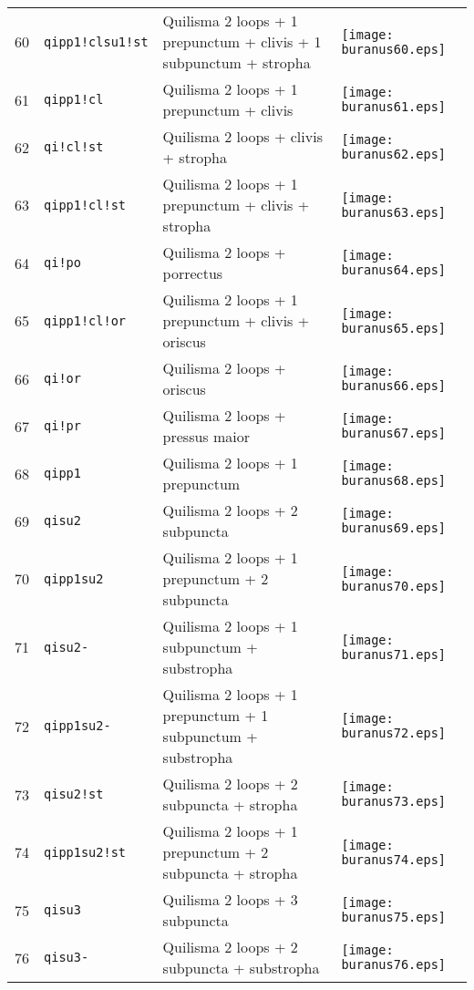 \documentclass{scrarticle}
\begin{document}
\begin{longtable}{l|l|l|l}
60 & \texttt{qipp1!clsu1!st} & Quilisma 2 loops + 1 prepunctum + clivis + 1 subpunctum + stropha & \texttt{[image: buranus60.eps]} \\
61 & \texttt{qipp1!cl} & Quilisma 2 loops + 1 prepunctum + clivis & \texttt{[image: buranus61.eps]} \\
62 & \texttt{qi!cl!st} & Quilisma 2 loops + clivis + stropha & \texttt{[image: buranus62.eps]} \\
63 & \texttt{qipp1!cl!st} & Quilisma 2 loops + 1 prepunctum + clivis + stropha & \texttt{[image: buranus63.eps]} \\
64 & \texttt{qi!po} & Quilisma 2 loops + porrectus & \texttt{[image: buranus64.eps]} \\
65 & \texttt{qipp1!cl!or} & Quilisma 2 loops + 1 prepunctum + clivis + oriscus & \texttt{[image: buranus65.eps]} \\
66 & \texttt{qi!or} & Quilisma 2 loops + oriscus & \texttt{[image: buranus66.eps]} \\
67 & \texttt{qi!pr} & Quilisma 2 loops + pressus maior & \texttt{[image: buranus67.eps]} \\
68 & \texttt{qipp1} & Quilisma 2 loops + 1 prepunctum & \texttt{[image: buranus68.eps]} \\
69 & \texttt{qisu2} & Quilisma 2 loops + 2 subpuncta & \texttt{[image: buranus69.eps]} \\
70 & \texttt{qipp1su2} & Quilisma 2 loops + 1 prepunctum + 2 subpuncta & \texttt{[image: buranus70.eps]} \\
71 & \texttt{qisu2-} & Quilisma 2 loops + 1 subpunctum + substropha & \texttt{[image: buranus71.eps]} \\
72 & \texttt{qipp1su2-} & Quilisma 2 loops + 1 prepunctum + 1 subpunctum + substropha & \texttt{[image: buranus72.eps]} \\
73 & \texttt{qisu2!st} & Quilisma 2 loops + 2 subpuncta + stropha & \texttt{[image: buranus73.eps]} \\
74 & \texttt{qipp1su2!st} & Quilisma 2 loops + 1 prepunctum + 2 subpuncta + stropha & \texttt{[image: buranus74.eps]} \\
75 & \texttt{qisu3} & Quilisma 2 loops + 3 subpuncta & \texttt{[image: buranus75.eps]} \\
76 & \texttt{qisu3-} & Quilisma 2 loops + 2 subpuncta + substropha & \texttt{[image: buranus76.eps]} \\

\end{longtable}
\end{document}
